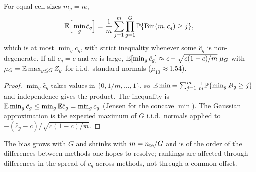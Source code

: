 \begin{proposition}\label{prop:min}
For equal cell sizes $m_g=m$,
\[
\mathbb{E}\Big[\min_g \hat c_g\Big]=\frac1m\sum_{j=1}^{m}\prod_{g=1}^{G}\mathbb{P}\{\mathrm{Bin}(m,c_g)\ge j\},
\]
which is at most $\min_g c_g$, with strict inequality whenever some $\hat c_g$ is non-degenerate.
If all $c_g=c$ and $m$ is large, $\mathbb{E}[\min_g\hat c_g]\approx c-\sqrt{c(1-c)/m}\;\mu_G$ with $\mu_G=\mathbb{E}\max_{g\le G}Z_g$ for i.i.d.\ standard normals ($\mu_{10}\approx1.54$).
\end{proposition}
\begin{proof}
$\min_g\hat c_g$ takes values in $\{0,1/m,\dots,1\}$, so $\mathbb{E}\min=\sum_{j=1}^m\frac1m\mathbb{P}\{\min_g B_g\ge j\}$ and independence gives the product.
The inequality is $\mathbb{E}\min_g\hat c_g\le\min_g\mathbb{E}\hat c_g=\min_g c_g$ (Jensen for the concave $\min$).
The Gaussian approximation is the expected maximum of $G$ i.i.d.\ normals applied to $-(\hat c_g-c)/\sqrt{c(1-c)/m}$.
\end{proof}

The bias grows with $G$ and shrinks with $m=n_{\rm te}/G$ and is of the order of the differences between methods one hopes to resolve; rankings are affected through differences in the spread of $c_g$ across methods, not through a common offset.

